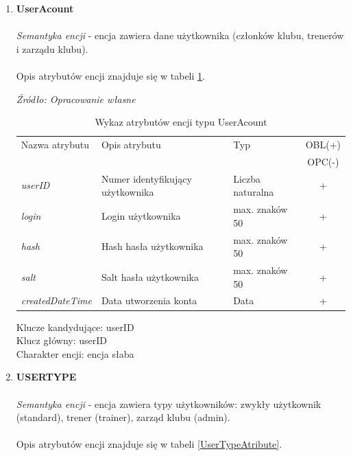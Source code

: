 \documentclass[12pt,oneside]{report}
\begin{document}
\begin{enumerate}[start=10,label={\bfseries ENC$\backslash$\arabic*}]
\item \textbf{UserAcount}\\ \\
\textit{Semantyka encji} - encja zawiera dane użytkownika (członków klubu, trenerów i zarządu klubu).
			\\ \\
Opis atrybutów encji znajduje się w tabeli \ref{UserAcountAtribute}.

\begin{table}[H]
	\caption{Wykaz atrybutów encji typu UserAcount }
	\textit{Źródło: Opracowanie własne}
	\label{UserAcountAtribute}
	\centering
	\begin{tabular}{|l|l|l|c|}
		\hline
		Nazwa atrybutu & Opis atrybutu & Typ & OBL(+) \\
		& & &  OPC(-) \\
		\hline
		\textit{userID} & Numer identyfikujący użytkownika & Liczba naturalna & + \\
		\hline
		\textit{login} & Login użytkownika & max. znaków 50 & + \\
		\hline
		\textit{hash} & Hash hasła użytkownika & max. znaków 50 & + \\
		\hline
		\textit{salt} & Salt hasła użytkownika & max. znaków 50 & + \\
		\hline
		\textit{createdDateTime} & Data utworzenia konta & Data & + \\
		\hline
	\end{tabular}
\end{table}
Klucze kandydujące: userID \\
Klucz główny: userID \\
Charakter encji: encja słaba \\

\item \textbf{USERTYPE} \\ \\
\textit{Semantyka encji} - encja zawiera typy użytkowników: zwykły użytkownik (standard), trener (trainer), zarząd klubu (admin).
			\\ \\
Opis atrybutów encji znajduje się w tabeli \ref{UserTypeAtribute}.


\end{enumerate}
\end{document}
